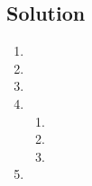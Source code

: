 \documentclass[submit]{harvardml}
\begin{document}
\subsection*{Solution}

\begin{enumerate}
  \item 
  \item 
  \item 
  \item \begin{enumerate}
      \item 
      \item
      \item 
  \end{enumerate}
  \item 
\end{enumerate}


\newpage
\end{document}
